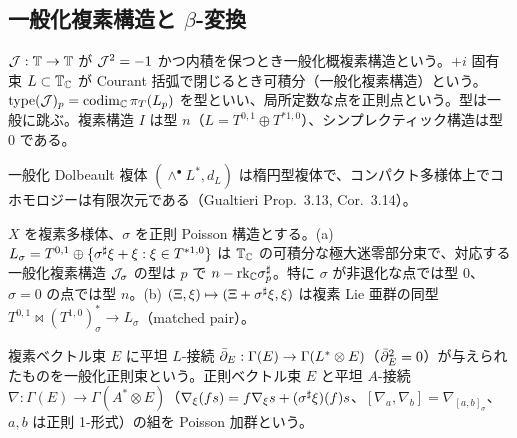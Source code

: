 \subsection{一般化複素構造と $\beta$-変換}
\begin{defn}[一般化複素構造・型]\tC\label{defn:GC}
$\mathcal J:\mathbb T\to\mathbb T$ が $\mathcal J^2=-1$ かつ内積を保つとき一般化概複素構造という。$+i$ 固有束 $L\subset\mathbb T_\mathbb C$ が Courant 括弧で閉じるとき可積分（一般化複素構造）という。$\mathrm{type}(\mathcal J)_p=\mathrm{codim}_\mathbb C\,\pi_T(L_p)$ を型といい、局所定数な点を正則点という。型は一般に跳ぶ。複素構造 $I$ は型 $n$（$L=T^{0,1}\oplus T^{*1,0}$）、シンプレクティック構造は型 $0$ である。
\end{defn}
一般化 Dolbeault 複体 $(\wedge^\bullet L^*,d_L)$ は楕円型複体で、コンパクト多様体上でコホモロジーは有限次元である（Gualtieri \cite{Gua11} Prop.~3.13, Cor.~3.14\tC）。

\begin{prop}[$\beta$-変換]\tC\label{prop:Jsigma}
$X$ を複素多様体、$\sigma$ を正則 Poisson 構造とする。(a) $L_\sigma=T^{0,1}\oplus\{\sigma^\sharp\xi+\xi:\xi\in T^{*1,0}\}$ は $\mathbb T_\mathbb C$ の可積分な極大迷零部分束で、対応する一般化複素構造 $\mathcal J_\sigma$ の型は $p$ で $n-\mathrm{rk}_\mathbb C\sigma^\sharp_p$。特に $\sigma$ が非退化な点では型 0、$\sigma=0$ の点では型 $n$。(b) $(\Xi,\xi)\mapsto(\Xi+\sigma^\sharp\xi,\xi)$ は複素 Lie 亜群の同型 $T^{0,1}\bowtie(T^{1,0})^*_\sigma\to L_\sigma$（matched pair）。
\end{prop}

\begin{defn}\tC\label{defn:GH}
複素ベクトル束 $E$ に平坦 $L$-接続 $\bar\partial_E:\Gamma(E)\to\Gamma(L^*\otimes E)$（$\bar\partial_E^2=0$）が与えられたものを一般化正則束という。正則ベクトル束 $E$ と平坦 $A$-接続 $\nabla:\Gamma(E)\to\Gamma(A^*\otimes E)$（$\nabla_\xi(fs)=f\nabla_\xi s+(\sigma^\sharp\xi)(f)s$、$[\nabla_a,\nabla_b]=\nabla_{[a,b]_\sigma}$、$a,b$ は正則 1-形式）の組を Poisson 加群という。
\end{defn}

